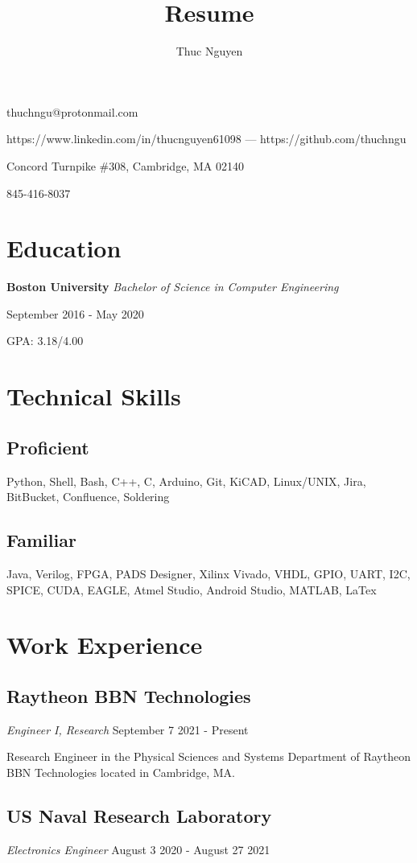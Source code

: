 \documentclass{article}
\makeatletter
\renewcommand{\maketitle}
{\begin{center}
{\huge\bfseries\theauthor}
\vspace{.5em}

thuchngu@protonmail.com

https://www.linkedin.com/in/thucnguyen61098 --- https://github.com/thuchngu

\end{center}}
\makeatother
\begin{document}
\title{Resume}
\author{Thuc Nguyen}
\maketitle
\vspace{-.5em}
{ Concord Turnpike \#308, Cambridge, MA 02140

845-416-8037

}
\vspace{-1.5em}
\section{Education}
\textbf{Boston University}  \textit{Bachelor of Science in Computer Engineering}

September 2016 - May 2020

GPA: 3.18/4.00

\vspace{-.75em}
\section{Technical Skills}
\subsection{Proficient}
Python, Shell, Bash, C++, C, Arduino, Git, KiCAD, Linux/UNIX, Jira, BitBucket, Confluence, Soldering
\vspace{-.75em}
\subsection{Familiar}
Java, Verilog, FPGA, PADS Designer, Xilinx Vivado, VHDL, GPIO, UART, I2C, SPICE, CUDA, EAGLE, Atmel Studio, Android Studio, MATLAB, LaTex

\vspace{-.75em}
\section{Work Experience}
\subsection{Raytheon BBN Technologies} \textit{Engineer I, Research}
  September 7 2021 - Present

Research Engineer in the Physical Sciences and Systems Department of Raytheon BBN Technologies located in Cambridge, MA.
\vspace{-.75em}
\subsection{US Naval Research Laboratory} \textit{Electronics Engineer}
  August 3 2020 - August 27 2021
\end{document}
